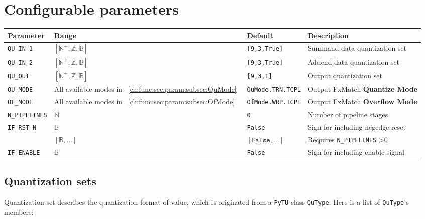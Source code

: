 \documentclass[a4paper, oneside]{report}
\begin{document}
        \section{Configurable parameters}
            \begin{longtable}{llll}
                \toprule
                \textbf{Parameter}  & \textbf{Range}  & \textbf{Default} & \textbf{Description} \\
                \midrule
                
                \texttt{QU\_IN\_1}     & $[\mathbb{N}^{+}, \mathbb{Z}, \mathbb{B}]$  & \texttt{[9,3,True]}                      & Summand data quantization set \\
                \texttt{QU\_IN\_2}    & $[\mathbb{N}^{+}, \mathbb{Z}, \mathbb{B}]$  & \texttt{[9,3,True]}                      & Addend data quantization set \\
                \texttt{QU\_OUT}     & $[\mathbb{N}^{+}, \mathbb{Z}, \mathbb{B}]$  & \texttt{[9,3,1]}                      & Output quantization set \\
                \texttt{QU\_MODE}    & All available modes in ~\ref{ch:func:sec:param:subsec:QuMode}~       & \texttt{QuMode.TRN.TCPL}     & Output FxMatch \textbf{Quantize Mode} \\
                \texttt{OF\_MODE}   &  All available modes in  ~\ref{ch:func:sec:param:subsec:OfMode}~     & \texttt{OfMode.WRP.TCPL} & Output FxMatch \textbf{Overflow Mode}          \\
                \texttt{N\_PIPELINES}  & $\mathbb{N}$  & \texttt{0}  & Number of pipeline stages \\
                \texttt{IF\_RST\_N}  & $\mathbb{B}$  & \texttt{False}  & Sign for including negedge reset \\
                                    & $[\mathbb{B}, ...]$ & $[\texttt{False}, ...]$ & Requires \texttt{N\_PIPELINES} >0      \\    
                \texttt{IF\_ENABLE}  & $\mathbb{B}$  & \texttt{False}  & Sign for including enable signal \\
                \bottomrule
            \end{longtable}
            \subsection{Quantization sets}\label{ch:func:sec:param:subsec:QuSet}
                Quantization set describes the quantization format of value, which is originated from a \texttt{PyTU} class \texttt{QuType}. Here is a list of \texttt{QuType}'s members:
\end{document}
